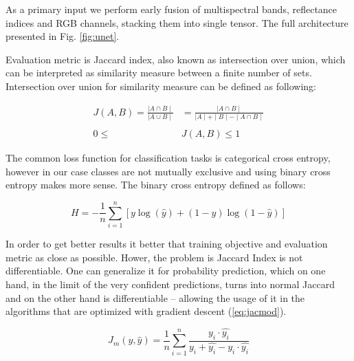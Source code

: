 \documentclass[10pt,twocolumn,letterpaper]{article}
\begin{document}
As a primary input we perform early fusion of multispectral bands, reflectance indices and RGB channels, stacking them into single tensor. The full architecture presented in Fig. \ref{fig:unet}.



Evaluation metric is Jaccard index, also known as intersection over union, which can be interpreted as similarity  measure between a finite number of sets. Intersection over union for similarity measure can be defined as following: 
 
\begin{equation}
\begin{aligned}
J(A,B) = \frac{\mid A \cap B \mid }{\mid A \cup B \mid} &= \frac{\mid A \cap B \mid}{\mid A \mid + \mid B \mid - \mid A \cap B \mid} \\ \\ 
0 \le & J(A,B) \le 1
\end{aligned}
\end{equation}

The common loss function for classification tasks is categorical cross entropy, however in our case classes are not mutually exclusive and using binary cross entropy makes more sense. The binary cross entropy defined as follows:

 
\begin{equation} \label{eq:bintropy}
H = -\frac{1}{n}\sum_{i=1}^n{[y \log(\hat{y})+(1-y)\log(1-\hat{y})]}
\end{equation}

In order to get better results it better that training objective and evaluation metric as close as possible. Hower, the problem is  Jaccard Index is not differentiable. One can generalize it for probability prediction, which on one hand, in the limit of the very confident predictions, turns into normal Jaccard and on the other hand is differentiable – allowing the usage of it in the algorithms that are optimized with gradient descent (\ref{eq:jacmod}). 

\begin{equation} \label{eq:jacmod}
J_{m}(y, \hat{y}) = \frac{1}{n} \sum_{i=1}^n \frac{y_i \cdot \hat{y_i}}{y_i + \hat{y_i} - y_i \cdot \hat{y_i}}
\end{equation}
\end{document}
